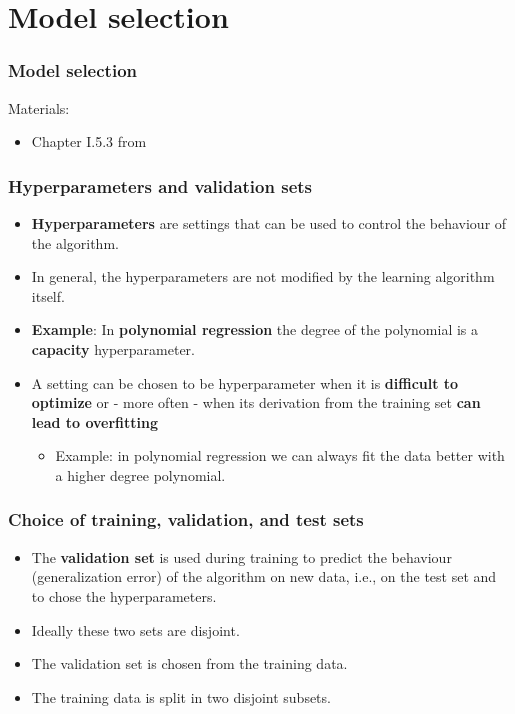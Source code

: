 \documentclass[notes]{beamer}          %
\newif\iffull
\begin{document}
\section{Model selection}

\begin{frame}
\frametitle{Model selection}
Materials:
\begin{itemize}
    \item Chapter I.5.3 from \cite{deeplearning}
\end{itemize}
\end{frame}

\begin{frame}
\frametitle{Hyperparameters and validation sets}
    \begin{itemize}
        \item {\bf Hyperparameters} are settings that can be used to control the behaviour of the algorithm.
        \item In general, the hyperparameters are not modified by the learning algorithm itself.
        \item {\bf Example}: In {\bf polynomial regression} the degree of the polynomial is a {\bf capacity} hyperparameter.
        \item A setting can be chosen to be hyperparameter when it is {\bf difficult to optimize} or - more often - when its derivation from the training set {\bf can lead to overfitting}
        \begin{itemize}
            \item Example: in polynomial regression we can always fit the data better with a higher degree polynomial.
        \end{itemize}
    \end{itemize}
\end{frame}


\begin{frame}
\frametitle{Choice of training, validation, and test sets}
    \begin{itemize}
        \item The {\bf validation set} is used during training to predict the behaviour (generalization error) of the algorithm on new data, i.e., on the {test set} and to chose the hyperparameters.
        \item Ideally these two sets are disjoint.
        \item The validation set is chosen from the training data.
        \item The training data is split in two disjoint subsets.
        \iffull
        \item One subset is used to learn the parameters of the algorithm and the other is the validation set.
        \item The subset used to learn the parameters is still typically called a {\bf training set}.
        \fi
    \end{itemize}
\end{frame}
\end{document}
